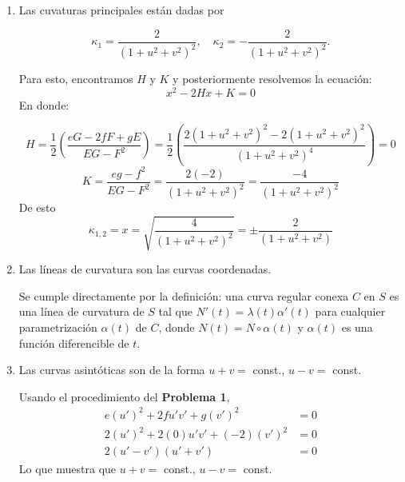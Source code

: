 \begin{problema}
\begin{enumerate}
\begin{sol}
\begin{itemize}
            
        \end{itemize}


    \end{sol}
    \item Las cuvaturas principales están dadas por
    
    $$
    \kappa_{1}=\frac{2}{\left(1+u^{2}+v^{2}\right)^{2}}, \quad \kappa_{2}=-\frac{2}{\left(1+u^{2}+v^{2}\right)^{2}} .
    $$
    \begin{sol}
        Para esto, encontramos $H$ y $K$ y posteriormente resolvemos la ecuación:
        $$x^2-2Hx+K=0$$
        En donde: 

        $$H=\frac{1}{2}\left(\frac{eG-2fF+gE}{EG-F^2}\right)=\frac{1}{2}\left(\frac{2(1+u^2+v^2)^2-2(1+u^2+v^2)^2}{(1+u^2+v^2)^4}\right)=0$$
        $$K= \frac{eg-f^2}{EG-F^2}=\frac{2(-2)}{(1+u^2+v^2)^2}=\frac{-4}{(1+u^2+v^2)^2} $$
        De esto
        $$\kappa_{1,2}=x=\sqrt{\frac{4}{(1+u^2+v^2)^2} }= \pm \frac{2}{(1+u^2+v^2)}$$
    \end{sol}
    
    \item Las líneas de curvatura son las curvas coordenadas.
    \begin{sol}
        Se cumple directamente por la definición: una curva regular conexa $C$ en $S$ es una línea de curvatura de $S$ tal que $N'(t)=\lambda (t)\alpha'(t)$ para cualquier parametrización $\alpha(t)$ de $C$, donde $N(t)=N\circ \alpha(t)$ y $\alpha(t)$ es una función diferencible de $t$. 
    \end{sol}
    
    \item Las curvas asintóticas son de la forma $u+v=$ const., $u-v=$ const.
    \begin{sol}
        Usando el procedimiento del \textbf{Problema 1}, 
        \begin{align*}
            e(u')^2+2fu'v'+g(v')^2&=0\\
            2(u')^2+2(0)u'v'+(-2)(v')^2 &=0\\ 
            2(u'-v')(u'+v') &= 0
        \end{align*}
        Lo que muestra que $u+v=$ const., $u-v=$ const.

    \end{sol}
\end{enumerate}




\end{problema}


